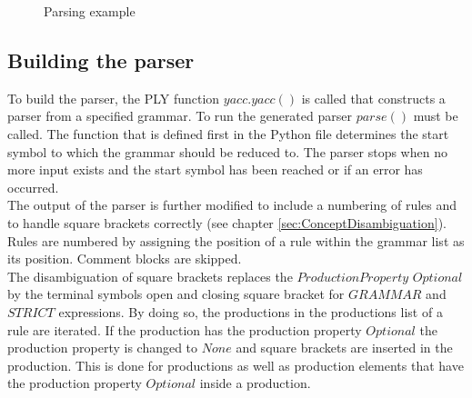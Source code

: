 \begin{figure}[H]
\caption{Parsing example}
\label{fig:ImplementationParsing}
\end{figure}
                
\subsection{Building the parser}\label{sec:ImplementationRunParser}

To build the parser, the \ac{PLY} function $yacc.yacc()$ is called that constructs a parser from a specified grammar. To run the generated parser $parse()$ must be called.
The function that is defined first in the Python file determines the start symbol to which the grammar should be reduced to.
The parser stops when no more input exists and the start symbol has been reached or if an error has occurred.\\
The output of the parser is further modified to include a numbering of rules and to handle square brackets correctly (see chapter \ref{sec:ConceptDisambiguation}).
Rules are numbered by assigning the position of a rule within the grammar list as its position. Comment blocks are skipped. \\
The disambiguation of square brackets replaces the $ProductionProperty$ $Optional$ by the terminal symbols open and closing square bracket for $GRAMMAR$ and $STRICT$ expressions.
By doing so, the productions in the productions list of a rule are iterated. If the production has the production property $Optional$ the production property is changed to $None$ and square brackets are inserted in the production. This is done for productions as well as production elements that have the production property $Optional$ inside a production.

